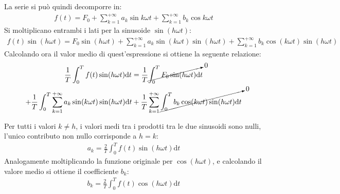 \documentclass{article}
\newcommand{\df}{\mathrm{d}}
\numberwithin{equation}{subsection}
\begin{document}
La serie si può quindi decomporre in:
\begin{gather}
    f(t)=F_0+\displaystyle\sum_{k=1}^{+\infty}a_k\sin k\omega t+\sum_{k=1}^{+\infty}b_k\cos k\omega t
\end{gather}
Si moltiplicano entrambi i lati per la sinusoide $\sin(h\omega t)$:
\begin{gather*}
    f(t)\sin(h\omega t)=F_0\sin(h\omega t)+\displaystyle\sum_{k=1}^{+\infty}a_k\sin (k\omega t)\sin(h\omega t)+\sum_{k=1}^{+\infty}b_k\cos (k\omega t)\sin(h\omega t)
\end{gather*}
Calcolando ora il valor medio di quest'espressione si ottiene la seguente relazione:
\begin{gather*}
    \displaystyle\frac{1}{T}\int_0^Tf(t)\sin(h\omega t)\df t=\frac{1}{T}\cancelto{0}{\int_0^TF_0\sin(h\omega t)\df} t\\
    +\frac{1}{T}\int_0^T\sum_{k=1}^{+\infty}a_k\sin (k\omega t)\sin(h\omega t)\df t+\frac{1}{T}\sum_{k=1}^{+\infty}\cancelto{0}{\int_0^Tb_k\cos (k\omega t)\sin(h\omega t)\df t}
\end{gather*}

Per tutti i valori $k\neq h$, i valori medi tra i prodotti tra le due sinusoidi sono nulli, l'unico contributo non nullo corrisponde a $h=k$:
\begin{gather*}
    a_k=\displaystyle\frac{2}{T}\int_0^Tf(t)\sin(h\omega t)\df t
\end{gather*}
Analogamente moltiplicando la funzione originale per $\cos(h\omega t)$, e calcolando il valore medio si ottiene il coefficiente $b_k$:
\begin{gather*}
    b_k=\displaystyle\frac{2}{T}\int_0^Tf(t)\cos(h\omega t)\df t
\end{gather*}
\end{document}
